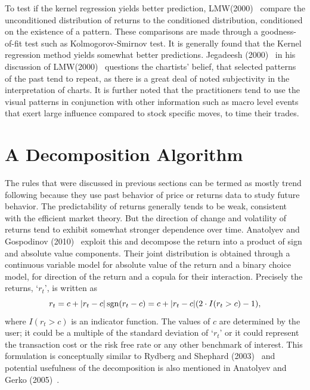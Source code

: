 To test if the kernel regression yields better prediction, LMW(2000)~\cite{LoMWang} compare the unconditioned distribution of returns to the conditioned distribution, conditioned on the existence of a pattern. These comparisons are made through a goodness-of-fit test such as Kolmogorov-Smirnov test. It  is generally found that the Kernel regression method yields somewhat better predictions. Jegadeesh (2000)~\cite{Jeqa} in his discussion of LMW(2000)~\cite{LoMWang} questions the chartists' belief, that selected patterns of the past tend to repeat, as there is a great deal of noted subjectivity in the interpretation of charts. It is further noted that the practitioners tend to use the visual patterns in conjunction with other information such as macro level events that exert large influence compared to stock specific moves, to time their trades.



\section{A Decomposition Algorithm \label{s:decomp_alg}}


The rules that were discussed in previous sections can be termed as mostly trend following because they use past behavior of price or returns data to study future behavior. The predictability of returns generally tends to be weak, consistent with the efficient market theory. But the direction of change and volatility of returns tend to exhibit somewhat stronger dependence over time. Anatolyev and Gospodinov (2010)~\cite{Ananto2} exploit this and decompose the return into a product of sign and absolute value components. Their joint distribution is obtained through a continuous variable model for absolute value of the return and a binary choice model, for direction of the return and a copula for their interaction. Precisely the returns, `$r_{t}$', is written as
	\begin{equation} \label{eqn:3sgn}
	r_t = c + \lvert r_t - c\rvert \sgn (r_t - c)= c + \lvert r_t - c \rvert (2\cdot I(r_t  > c) - 1),
	\end{equation}
where $I(r_t > c)$ is an indicator function. The values of $c$ are determined by the user; it could be a multiple of the standard deviation of `$r_{t}$' or it could represent the transaction cost or the risk free rate or any other benchmark of interest. This formulation is conceptually similar to Rydberg and Shephard (2003)~\cite{Ryd} and potential usefulness of the decomposition is also mentioned in Anatolyev and Gerko (2005)~\cite{Ananto1}.



